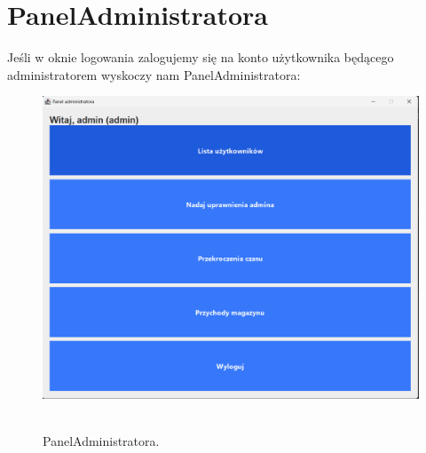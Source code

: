 \section{PanelAdministratora}
\label{sec:PanelAdministratora}
Jeśli w oknie logowania zalogujemy się na konto użytkownika będącego administratorem wyskoczy nam PanelAdministratora:
\begin{figure}[H]
    \centering
    \includegraphics[width=.7\linewidth]{figures/PanelAdministratora.png}\
    \caption{PanelAdministratora.\label{PanelAdministratora}}
\end{figure}
\clearpage
